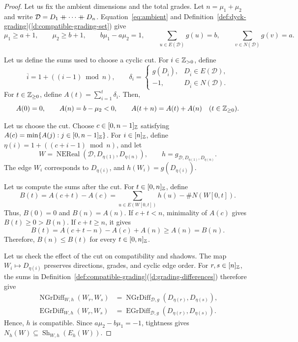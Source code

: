 \begin{proof}
Let us fix the ambient dimensions and the total grades.
Let $n=\mu_1+\mu_2$ and write $\mathcal D=D_1\mathbin{+\mkern-10mu+}\cdots\mathbin{+\mkern-10mu+} D_n$.
Equation~\eqref{eq:ambient} and Definition~\ref{def:dyck-grading}(\ref{d:compatible-grading-set}) give
\[
 \mu_1\ge a+1,\qquad \mu_2\ge b+1,\qquad
 b\mu_1-a\mu_2=1,\qquad
 \sum_{u\in E(\mathcal D)}g(u)=b,\qquad
 \sum_{v\in N(\mathcal D)}g(v)=a.
\]

Let us define the sums used to choose a cyclic cut.
For $i\in\mathbb Z_{>0}$, define
\[
 \overline i=1+((i-1)\bmod n),\qquad
 \delta_i=
 \begin{cases}
 g(D_{\overline i}),&D_{\overline i}\in E(\mathcal D),\\
 -1,&D_{\overline i}\in N(\mathcal D).
 \end{cases}
\]
For $t\in\mathbb Z_{\ge0}$, define $A(t)=\sum_{i=1}^{t}\delta_i$.
Then,
\[
 A(0)=0,\qquad A(n)=b-\mu_2<0,\qquad
 A(t+n)=A(t)+A(n)\quad(t\in\mathbb Z_{\ge0}).
\]

Let us choose the cut.
Choose $c\in[0,n-1]_{\mathbb Z}$ satisfying
$A(c)=\min\{A(j):j\in[0,n-1]_{\mathbb Z}\}$.
For $i\in[n]_{\mathbb Z}$, define $\eta(i)=1+((c+i-1)\bmod n)$, and let
\[
 W=\operatorname{NEReal}(\mathcal D,D_{\eta(1)},D_{\eta(n)}),
 \qquad h=g_{\mathcal D,D_{\eta(1)},D_{\eta(n)}}.
\]
The edge $W_i$ corresponds to $D_{\eta(i)}$, and
$h(W_i)=g(D_{\eta(i)})$.

Let us compute the sums after the cut.
For $t\in[0,n]_{\mathbb Z}$, define
\[
 B(t)=A(c+t)-A(c)
 =\sum_{u\in E(W[0,t])}h(u)-\#N(W[0,t]).
\]
Thus, $B(0)=0$ and $B(n)=A(n)$.
If $c+t<n$, minimality of $A(c)$ gives $B(t)\ge0>B(n)$.
If $c+t\ge n$, it gives
\[
 B(t)=A(c+t-n)-A(c)+A(n)\ge A(n)=B(n).
\]
Therefore, $B(n)\le B(t)$ for every $t\in[0,n]_{\mathbb Z}$.

Let us check the effect of the cut on compatibility and shadows.
The map $W_i\mapsto D_{\eta(i)}$ preserves directions, grades, and cyclic edge order.
For $r,s\in[n]_{\mathbb Z}$, the sums in Definition~\ref{def:compatible-grading}(\ref{d:grading-differences}) therefore give
\[
 \begin{aligned}
 \operatorname{NGrDiff}_{W,h}(W_r,W_s)
 &=\operatorname{NGrDiff}_{\mathcal D,g}(D_{\eta(r)},D_{\eta(s)}),\\
 \operatorname{EGrDiff}_{W,h}(W_r,W_s)
 &=\operatorname{EGrDiff}_{\mathcal D,g}(D_{\eta(r)},D_{\eta(s)}).
 \end{aligned}
\]
Hence, $h$ is compatible.
Since $a\mu_2-b\mu_1=-1$, tightness gives
$N_h(W)\subseteq\operatorname{Sh}_{W,h}(E_h(W))$.


\end{proof}
